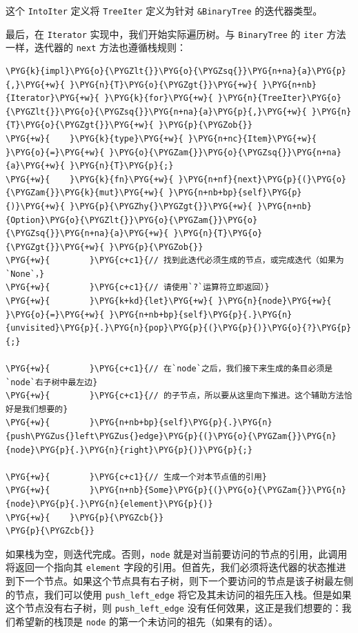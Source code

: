 这个 \texttt{IntoIter} 定义将 \texttt{TreeIter} 定义为针对 \texttt{\&BinaryTree} 的迭代器类型。

最后，在 \texttt{Iterator} 实现中，我们开始实际遍历树。与 \texttt{BinaryTree} 的 \texttt{iter} 方法一样，迭代器的 \texttt{next} 方法也遵循栈规则：

\begin{Verbatim}[commandchars=\\\{\},breaklines=true,breakanywhere=true,fontsize=\codefont,xleftmargin=17bp]
\PYG{k}{impl}\PYG{o}{\PYGZlt{}}\PYG{o}{\PYGZsq{}}\PYG{n+na}{a}\PYG{p}{,}\PYG{+w}{ }\PYG{n}{T}\PYG{o}{\PYGZgt{}}\PYG{+w}{ }\PYG{n+nb}{Iterator}\PYG{+w}{ }\PYG{k}{for}\PYG{+w}{ }\PYG{n}{TreeIter}\PYG{o}{\PYGZlt{}}\PYG{o}{\PYGZsq{}}\PYG{n+na}{a}\PYG{p}{,}\PYG{+w}{ }\PYG{n}{T}\PYG{o}{\PYGZgt{}}\PYG{+w}{ }\PYG{p}{\PYGZob{}}
\PYG{+w}{    }\PYG{k}{type}\PYG{+w}{ }\PYG{n+nc}{Item}\PYG{+w}{ }\PYG{o}{=}\PYG{+w}{ }\PYG{o}{\PYGZam{}}\PYG{o}{\PYGZsq{}}\PYG{n+na}{a}\PYG{+w}{ }\PYG{n}{T}\PYG{p}{;}
\PYG{+w}{    }\PYG{k}{fn}\PYG{+w}{ }\PYG{n+nf}{next}\PYG{p}{(}\PYG{o}{\PYGZam{}}\PYG{k}{mut}\PYG{+w}{ }\PYG{n+nb+bp}{self}\PYG{p}{)}\PYG{+w}{ }\PYG{p}{\PYGZhy{}\PYGZgt{}}\PYG{+w}{ }\PYG{n+nb}{Option}\PYG{o}{\PYGZlt{}}\PYG{o}{\PYGZam{}}\PYG{o}{\PYGZsq{}}\PYG{n+na}{a}\PYG{+w}{ }\PYG{n}{T}\PYG{o}{\PYGZgt{}}\PYG{+w}{ }\PYG{p}{\PYGZob{}}
\PYG{+w}{        }\PYG{c+c1}{// 找到此迭代必须生成的节点，或完成迭代（如果为`None`，}
\PYG{+w}{        }\PYG{c+c1}{// 请使用`?`运算符立即返回）}
\PYG{+w}{        }\PYG{k+kd}{let}\PYG{+w}{ }\PYG{n}{node}\PYG{+w}{ }\PYG{o}{=}\PYG{+w}{ }\PYG{n+nb+bp}{self}\PYG{p}{.}\PYG{n}{unvisited}\PYG{p}{.}\PYG{n}{pop}\PYG{p}{(}\PYG{p}{)}\PYG{o}{?}\PYG{p}{;}

\PYG{+w}{        }\PYG{c+c1}{// 在`node`之后，我们接下来生成的条目必须是`node`右子树中最左边}
\PYG{+w}{        }\PYG{c+c1}{// 的子节点，所以要从这里向下推进。这个辅助方法恰好是我们想要的}
\PYG{+w}{        }\PYG{n+nb+bp}{self}\PYG{p}{.}\PYG{n}{push\PYGZus{}left\PYGZus{}edge}\PYG{p}{(}\PYG{o}{\PYGZam{}}\PYG{n}{node}\PYG{p}{.}\PYG{n}{right}\PYG{p}{)}\PYG{p}{;}

\PYG{+w}{        }\PYG{c+c1}{// 生成一个对本节点值的引用}
\PYG{+w}{        }\PYG{n+nb}{Some}\PYG{p}{(}\PYG{o}{\PYGZam{}}\PYG{n}{node}\PYG{p}{.}\PYG{n}{element}\PYG{p}{)}
\PYG{+w}{    }\PYG{p}{\PYGZcb{}}
\PYG{p}{\PYGZcb{}}
\end{Verbatim}

如果栈为空，则迭代完成。否则，\texttt{node} 就是对当前要访问的节点的引用，此调用将返回一个指向其 \texttt{element} 字段的引用。但首先，我们必须将迭代器的状态推进到下一个节点。如果这个节点具有右子树，则下一个要访问的节点是该子树最左侧的节点，我们可以使用 \texttt{push\_left\_edge} 将它及其未访问的祖先压入栈。但是如果这个节点没有右子树，则 \texttt{push\_left\_edge} 没有任何效果，这正是我们想要的：我们希望新的栈顶是 \texttt{node} 的第一个未访问的祖先（如果有的话）。

